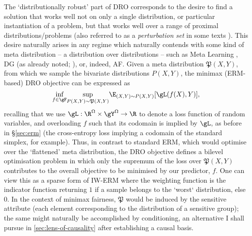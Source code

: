 The `distributionally robust' part of \ac{DRO} corresponds to the desire to find a solution that
works well not on only a single distribution, or particular instantiation of a problem, but that
works well over a range of proximal distributions/problems (also referred to as a
\emph{perturbation set} in some texts \citep{ben2009robust}). 
%
This desire naturally arises in any regime which naturally contends with some kind of meta
distribution -- a distribution over distributions -- such as Meta Learning \citep{collins2020task},
\ac{DG} (as already noted; \citealp{sagawa2019distributionally}), or, indeed, \ac{AF}.
%
Given a meta distribution \(\mathfrak{P}(X, Y)\), from which we sample the bivariate distributions \(
P(X, Y) \), the minimax (\ac{ERM}-based) \ac{DRO} objective can be expressed as 
%
\begin{equation}
    \underset{f \in \gF}{\text{inf}} 
    \underset{P(X, Y) \sim \mathfrak{P}(X, Y)}{\text{sup}}
    \E_{(X, Y) \sim P(X, Y)}[\gL(f(X), Y) ],
    \label{eq:dro-obj}
 \end{equation}
%
recalling that we use \( \gL: \R^\Omega \times \gY^\Omega \to \R \) to denote a loss function of
random variables, and overloading \(f\) such that its codomain is implied by \(\gL\), as before in
\S\ref{sec:erm} (the cross-entropy loss implying a codomain of the standard simplex, for example).
%
Thus, in contrast to standard \ac{ERM}, which would optimise over the `flattened' meta
distribution, the \ac{DRO} objective defines a bilevel optimisation problem in which only the
supremum of the loss over \( \mathfrak{P}(X, Y) \) contributes to the overall objective to be
minimised by our predictor, \(f\).
%
One can view this as a sparse form of \ac{IW}-\ac{ERM} where the weighting function is the
indicator function returning \(1\) if a sample belongs to the `worst` distribution, else \(0\).
%
In the context of minimax fairness, \(\mathfrak{P}\) would be induced by the sensitive attribute
(each element corresponding to the distribution of a sensitive group); the same might naturally be
accomplished by conditioning, an alternative I shall pursue in \ref{sec:lens-of-causality} after
establishing a causal basis.
%

